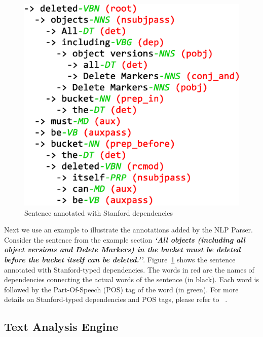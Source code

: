 \begin{figure}
	\centering
		\includegraphics[scale=0.3]{StanfordAnnotated.eps}
	\caption{Sentence annotated with Stanford dependencies}
	\label{fig:standep}
\end{figure}

Next we use an example to illustrate the annotations added by the NLP Parser. Consider the sentence from the example section \textbf{\textit{`All objects (including all object versions and Delete Markers) in the bucket must be deleted before the bucket itself can be deleted.''}}. Figure~\ref{fig:standep} shows the sentence annotated with Stanford-typed dependencies. The words in red are the names of dependencies connecting the actual words of the sentence (in black). Each word is followed by the Part-Of-Speech (POS) tag of the word (in green). For more details on Stanford-typed dependencies and POS tags, please refer to ~\cite{Marneffe06LREC,Marneffe08COLING}.

\subsection{Text Analysis Engine}
\label{sub:TAE}
%

